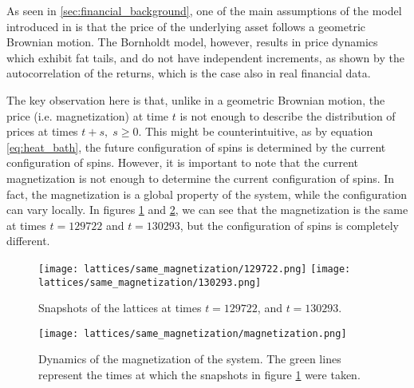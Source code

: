 As seen in \ref{sec:financial_background}, one of the main assumptions of the model introduced in \cite{black_scholes} is that the price of the underlying asset follows a geometric Brownian motion. The Bornholdt model, however, results in price dynamics which exhibit fat tails, and do not have independent increments, as shown by the autocorrelation of the returns, which is the case also in real financial data.

The key observation here is that, unlike in a geometric Brownian motion, the price (i.e. magnetization) at time $t$ is not enough to describe the distribution of prices at times $t+s, \; s\geq 0$. This might be counterintuitive, as by equation \ref{eq:heat_bath}, the future configuration of spins is determined by the current configuration of spins. However, it is important to note that the current magnetization is not enough to determine the current configuration of spins. In fact, the magnetization is a global property of the system, while the configuration can vary locally. In figures \ref{fig:lattices_m100} and \ref{fig:magnetization_m100}, we can see that the magnetization is the same at times $t=129722$ and $t=130293$, but the configuration of spins is completely different.

\begin{figure}[H]
    \centering
    \texttt{[image: lattices/same\_magnetization/129722.png]}
    \texttt{[image: lattices/same\_magnetization/130293.png]}
    \caption{Snapshots of the lattices at times $t=129722$, and $t=130293$.}
    \label{fig:lattices_m100}
\end{figure}

\begin{figure}[H]
    \centering
    \texttt{[image: lattices/same\_magnetization/magnetization.png]}
    \caption{Dynamics of the magnetization of the system. The green lines represent the times at which the snapshots in figure \ref{fig:lattices_m100} were taken.}
    \label{fig:magnetization_m100}
\end{figure}